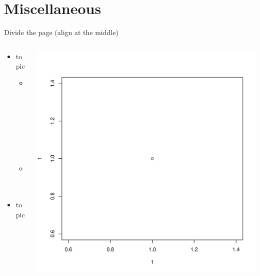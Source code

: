 \documentclass[table]{beamer}
\begin{document}
\section{Miscellaneous}
\label{sec:org59c124d}

\begin{frame}[label={sec:org77cd7aa}]{Divide the page (align at the middle)}
\begin{columns}
\begin{column}{0.45\columnwidth}
\begin{itemize}
\item topic
\begin{itemize}
\item subtopic
\item sub
\end{itemize}
\item topic
\end{itemize}
\end{column}

\begin{column}{0.45\columnwidth}
\begin{center}
\includegraphics[width=.9\linewidth]{./figures/myplot.pdf}
\end{center}
\end{column}
\end{columns}
\end{frame}
\end{document}
